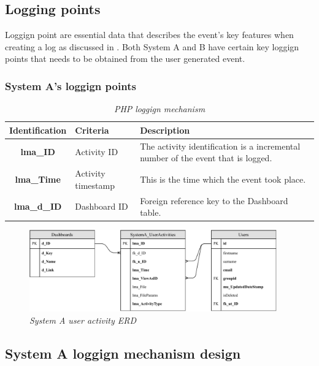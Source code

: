 \subsection{Logging points}
Loggign point are essential data that describes the event's key features when creating a log as discussed in . Both System A and B have certain key loggign points that needs to be obtained from the user generated event.

\subsubsection{System A's loggign points}

\begin{table}[!htb]
	\centering
	\small
	\caption[Loggign points]
	{\textit{PHP loggign mechanism}}
	\label{tbl:PHP_LoggignMechanism}
	\begin{tabularx}{\textwidth}{|c|l|X|}
		\hline \textbf{Identification} & \textbf{Criteria} & \textbf{Description} \\
        \hline \textbf{lma\_ID} & Activity ID & The activity identification is a incremental number of the event that is logged.\\
        \hline \textbf{lma\_Time} & Activity timestamp & This is the time which the event took place.\\
        \hline \textbf{lma\_d\_ID} & Dashboard ID & Foreign reference key to the Dashboard table.\\
		\hline
	\end{tabularx}
\end{table}

\begin{figure}[!htb] %
	\centering %
	\includegraphics[width=0.95\textwidth]{Images/Chapter2/SystemA_ERD_Basic/SystemA_ERD_Basic.pdf}
	\caption[System A user activity ERD]
	{\textit{System A user activity ERD}}\label{fig:SystemA_Basic_ERD}
\end{figure}

\subsection{System A loggign mechanism design}

